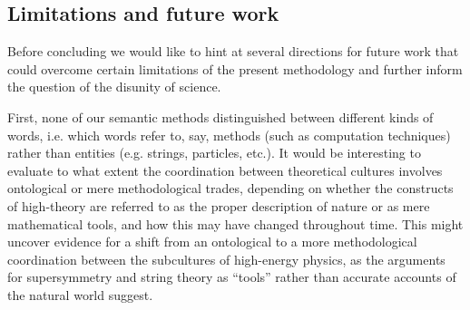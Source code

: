 \documentclass[smallextended]{svjour3}
\begin{document}

\subsection{Limitations and future work}

Before concluding we would like to hint at several directions for future work that could overcome certain limitations of the present methodology and further inform the question of the disunity of science.

First, none of our semantic methods distinguished between different kinds of words, i.e. which words refer to, say, methods (such as computation techniques) rather than entities  (e.g. strings, particles, etc.). It would be interesting to evaluate to what extent the coordination between theoretical cultures involves ontological or mere methodological trades, depending on whether the constructs of high-theory are referred to as the proper description of nature or as mere mathematical tools, and how this may have changed throughout time. %
This might uncover evidence for a shift from an ontological to a more methodological coordination between the subcultures of high-energy physics, as the arguments for supersymmetry and string theory as ``tools'' rather than accurate accounts of the natural world suggest.
\end{document}
